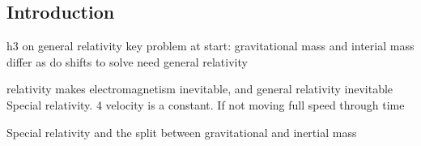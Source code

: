 
\subsection{Introduction}

		h3 on general relativity
			key problem at start: gravitational mass and interial mass differ as do shifts
			to solve need general relativity

		relativity makes electromagnetism inevitable, and general relativity inevitable
Special relativity. 4 velocity is a constant. If not moving full speed through time

Special relativity and the split between gravitational and inertial mass



